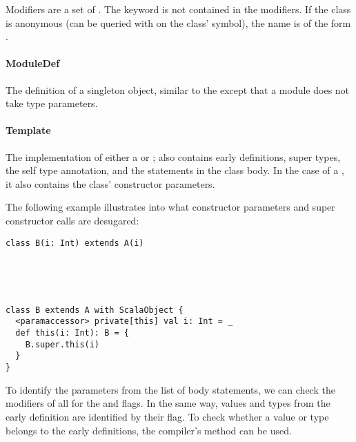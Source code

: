 Modifiers are a set of . The  keyword is not contained in the modifiers. If the class is anonymous (can be queried with  on the class' symbol), the name is of the form .

\paragraph{ModuleDef} 

\noindent The definition of a singleton object, similar to the  except that a module does not take type parameters. 

\paragraph{Template} 

\noindent The implementation of either a  or ; also contains early definitions, super types, the self type annotation, and the statements in the class body. In the case of a , it also contains the class' constructor parameters.

The following example illustrates into what constructor parameters and super constructor calls are desugared:

\begin{multicols}{2}
\begin{lstlisting}
class B(i: Int) extends A(i)





\end{lstlisting}

\begin{lstlisting}
class B extends A with ScalaObject {
  <paramaccessor> private[this] val i: Int = _
  def this(i: Int): B = {
    B.super.this(i)
  }
}
\end{lstlisting}
\end{multicols}

To identify the parameters from the list of body statements, we can check the modifiers of all  for the  and  flags. In the same way, values and types from the early definition are identified by their  flag. To check whether a value or type belongs to the early definitions, the compiler's  method can be used.

